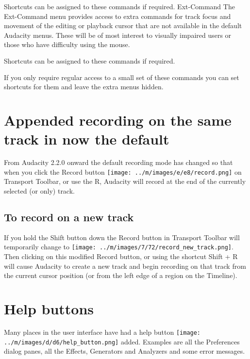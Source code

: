 Shortcuts can be assigned to these commands if required.
Ext-Command
The Ext-Command menu provides access to extra commands for track focus and movement of the editing or playback cursor that are not available in the default Audacity menus. These will be of most interest to visually impaired users or those who have difficulty using the mouse.

Shortcuts can be assigned to these commands if required.

If you only require regular access to a small set of these commands you can set shortcuts for them and leave the extra menus hidden.



\section{Appended recording on the same track in now the default}


From Audacity 2.2.0 onward the default recording mode has changed so that when you click the Record button \texttt{[image: ../m/images/e/e8/record.png]} on Transport Toolbar, or use the R, Audacity will record at the end of the currently selected (or only) track.

\subsection{To record on a new track}


If you hold the Shift button down the Record button in Transport Toolbar will temporarily change to \texttt{[image: ../m/images/7/72/record\_new\_track.png]}. Then clicking on this modified Record button, or using the shortcut Shift + R will cause Audacity to create a new track and begin recording on that track from the current cursor position (or from the left edge of a region on the Timeline). 



\section{Help buttons}


Many places in the user interface have had a help button \texttt{[image: ../m/images/d/d6/help\_button.png]} added. Examples are all the Preferences dialog panes, all the Effects, Generators and Analyzers and some error messages.

